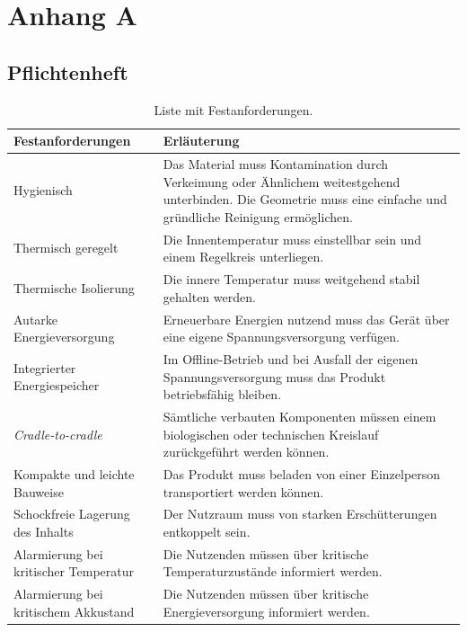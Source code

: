 \chapter{Anhang A}
	\section{Pflichtenheft}
		\begin{table}[h]
			\centering
			\caption{Liste mit Festanforderungen.}
			\begin{tabular}{@{}p{}p{}@{}}
				\toprule
				\textbf{Festanforderungen} 						& \textbf{Erläuterung} \\
				\midrule
				Hygienisch										& Das Material muss Kontamination durch Verkeimung
				oder Ähnlichem weitestgehend unterbinden. Die Geometrie muss eine einfache und gründliche Reinigung ermöglichen.\\
				Thermisch geregelt								& Die Innentemperatur muss einstellbar sein und einem Regelkreis unterliegen.\\
				Thermische Isolierung							& Die innere Temperatur muss weitgehend stabil gehalten werden. \\
				Autarke Energieversorgung						& Erneuerbare Energien nutzend muss das Gerät über eine eigene Spannungsversorgung verfügen.\\
				Integrierter Energiespeicher					& Im Offline-Betrieb und bei Ausfall der eigenen Spannungsversorgung muss das Produkt betriebsfähig bleiben.\\
				\textit{Cradle-to-cradle}						& Sämtliche verbauten Komponenten müssen einem biologischen oder technischen Kreislauf zurückgeführt werden können.\\
				Kompakte und leichte Bauweise 					& Das Produkt muss beladen von einer Einzelperson transportiert werden können.\\
				Schockfreie Lagerung des Inhalts 				& Der Nutzraum muss von starken Erschütterungen entkoppelt sein.\\
				Alarmierung bei kritischer Temperatur			& Die Nutzenden müssen über kritische Temperaturzustände informiert werden.\\
				Alarmierung bei kritischem Akkustand			& Die Nutzenden müssen über kritische Energieversorgung informiert werden.\\
				\bottomrule
			\end{tabular}
		\end{table}
